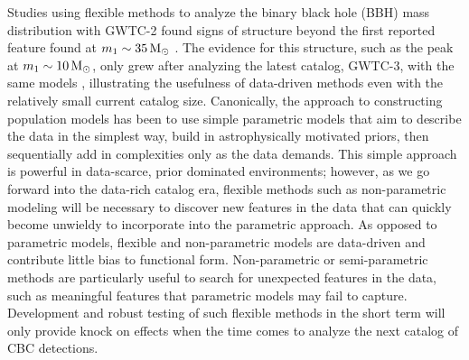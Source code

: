 Studies using flexible methods to analyze the binary black hole (BBH) mass distribution with GWTC-2 found signs of structure beyond the first reported feature found at 
$m_1\sim35\,{\rm M}_\odot$ \citep{Talbot_2018,o3a_pop,Tiwari_2021_b,Edelman_2022ApJ}. The evidence for this structure, 
such as the peak at $m_1\sim10\,{\rm M}_\odot$, only grew after analyzing the latest catalog, GWTC-3, with the same models \citep{o3b_astro_dist,Tiwari_2022ApJ}, illustrating  
the usefulness of data-driven methods even with the relatively small current catalog size. Canonically, the approach to constructing population models has been 
to use simple parametric models that aim to describe the data in the simplest way, build in astrophysically motivated priors, then sequentially add in 
complexities only as the data demands. This simple approach is powerful in data-scarce, prior dominated environments; however, as we go forward into 
the data-rich catalog era, flexible methods such as non-parametric modeling will be necessary to discover new features in the data that can quickly 
become unwieldy to incorporate into the parametric approach. As opposed to parametric models, flexible and non-parametric models are data-driven and 
contribute little bias to functional form. Non-parametric or semi-parametric methods are particularly useful to search for unexpected features in the 
data, such as meaningful features that parametric models may fail to capture. Development and robust testing of such flexible methods in the short 
term will only provide knock on effects when the time comes to analyze the next catalog of CBC detections.

